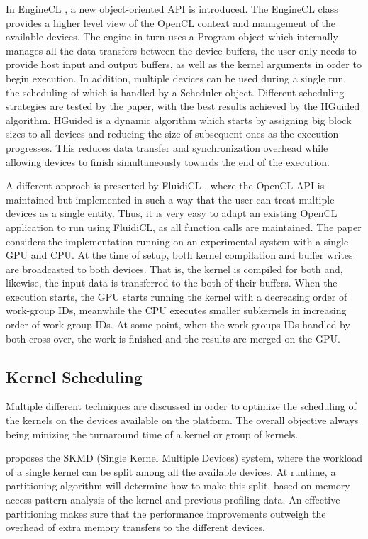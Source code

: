 In EngineCL \cite{enginecl}, a new object-oriented API is introduced. The EngineCL class provides a higher level view of the OpenCL context and management of the available devices. The engine in turn uses a Program object which internally manages all the data transfers between the device buffers, the user only needs to provide host input and output buffers, as well as the kernel arguments in order to begin execution. In addition, multiple devices can be used during a single run, the scheduling of which is handled by a Scheduler object. Different scheduling strategies are tested by the paper, with the best results achieved by the HGuided algorithm. HGuided is a dynamic algorithm which starts by assigning big block sizes to all devices and reducing the size of subsequent ones as the execution progresses. This reduces data transfer and synchronization overhead while allowing devices to finish simultaneously towards the end of the execution.

A different approch is presented by FluidiCL \cite{fluidicl}, where the OpenCL API is maintained but implemented in such a way that the user can treat multiple devices as a single entity. Thus, it is very easy to adapt an existing OpenCL application to run using FluidiCL, as all function calls are maintained. The paper considers the implementation running on an experimental system with a single GPU and CPU. At the time of setup, both kernel compilation and buffer writes are broadcasted to both devices. That is, the kernel is compiled for both and, likewise, the input data is transferred to the both of their buffers. When the execution starts, the GPU starts running the kernel with a decreasing order of work-group IDs, meanwhile the CPU executes smaller subkernels in increasing order of work-group IDs. At some point, when the work-groups IDs handled by both cross over, the work is finished and the results are merged on the GPU.

\subsection{Kernel Scheduling}
Multiple different techniques are discussed in order to optimize the scheduling of the kernels on the devices available on the platform. The overall objective always being minizing the turnaround time of a kernel or group of kernels.

\cite{transparent_cpu_gpu_collaboration} proposes the SKMD (Single Kernel Multiple Devices) system, where the workload of a single kernel can be split among all the available devices. At runtime, a partitioning algorithm will determine how to make this split, based on memory access pattern analysis of the kernel and previous profiling data. An effective partitioning makes sure that the performance improvements outweigh the overhead of extra memory transfers to the different devices. 

